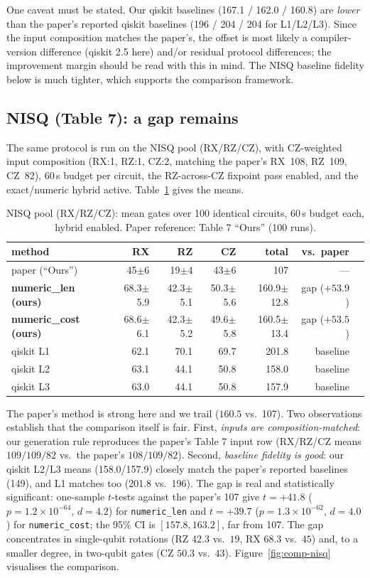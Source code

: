 \documentclass[11pt,a4paper]{article}
\begin{document}
One caveat must be stated. Our qiskit baselines (167.1 / 162.0 / 160.8) are
\emph{lower} than the paper's reported qiskit baselines (196 / 204 / 204 for
L1/L2/L3). Since the input composition matches the paper's, the offset is most
likely a compiler-version difference (qiskit 2.5 here) and/or residual protocol
differences; the improvement margin should be read with this in mind. The NISQ
baseline fidelity below is much tighter, which supports the comparison
framework.

\subsection{NISQ (Table 7): a gap remains}
\label{sec:nisq}
The same protocol is run on the NISQ pool (RX/RZ/CZ), with CZ-weighted input
composition (RX:1, RZ:1, CZ:2, matching the paper's RX~108, RZ~109, CZ~82),
60\,s budget per circuit, the RZ-across-CZ fixpoint pass enabled, and the
exact/numeric hybrid active. Table~\ref{tab:nisq} gives the means.

\begin{table}[H]
\centering
\caption{NISQ pool (RX/RZ/CZ): mean gates over 100 identical circuits, 60\,s
budget each, hybrid enabled. Paper reference: Table 7 ``Ours'' (100 runs).}
\label{tab:nisq}
\begin{tabular}{lrrrrrr}
\toprule
method & RX & RZ & CZ & total & vs.\ paper \\
\midrule
paper (``Ours'')  & 45$\pm$6 & 19$\pm$4 & 43$\pm$6 & 107 & --- \\
\textbf{numeric\_len (ours)}  & 68.3$\pm$5.9 & 42.3$\pm$5.1 & 50.3$\pm$5.6 & 160.9$\pm$12.8 & gap ($+53.9$) \\
\textbf{numeric\_cost (ours)} & 68.6$\pm$6.1 & 42.3$\pm$5.2 & 49.6$\pm$5.8 & 160.5$\pm$13.4 & gap ($+53.5$) \\
qiskit L1 & 62.1 & 70.1 & 69.7 & 201.8 & baseline \\
qiskit L2 & 63.1 & 44.1 & 50.8 & 158.0 & baseline \\
qiskit L3 & 63.0 & 44.1 & 50.8 & 157.9 & baseline \\
\bottomrule
\end{tabular}
\end{table}

The paper's method is strong here and we trail ($160.5$ vs.\ 107). Two
observations establish that the comparison itself is fair. First,
\emph{inputs are composition-matched}: our generation rule reproduces the
paper's Table 7 input row (RX/RZ/CZ means $109/109/82$ vs.\ the paper's
$108/109/82$). Second, \emph{baseline fidelity is good}: our qiskit L2/L3 means
(158.0/157.9) closely match the paper's reported baselines (149), and L1
matches too (201.8 vs.\ 196). The gap is real and statistically significant:
one-sample $t$-tests against the paper's 107 give $t=+41.8$
($p=1.2\times10^{-64}$, $d=4.2$) for \texttt{numeric\_len} and $t=+39.7$
($p=1.3\times10^{-62}$, $d=4.0$) for \texttt{numeric\_cost}; the 95\% CI is
$[157.8,163.2]$, far from 107. The gap concentrates in single-qubit rotations
(RZ $42.3$ vs.\ $19$, RX $68.3$ vs.\ $45$) and, to a smaller degree, in
two-qubit gates (CZ $50.3$ vs.\ $43$).
Figure~\ref{fig:comp-nisq} visualises the comparison.
\end{document}
